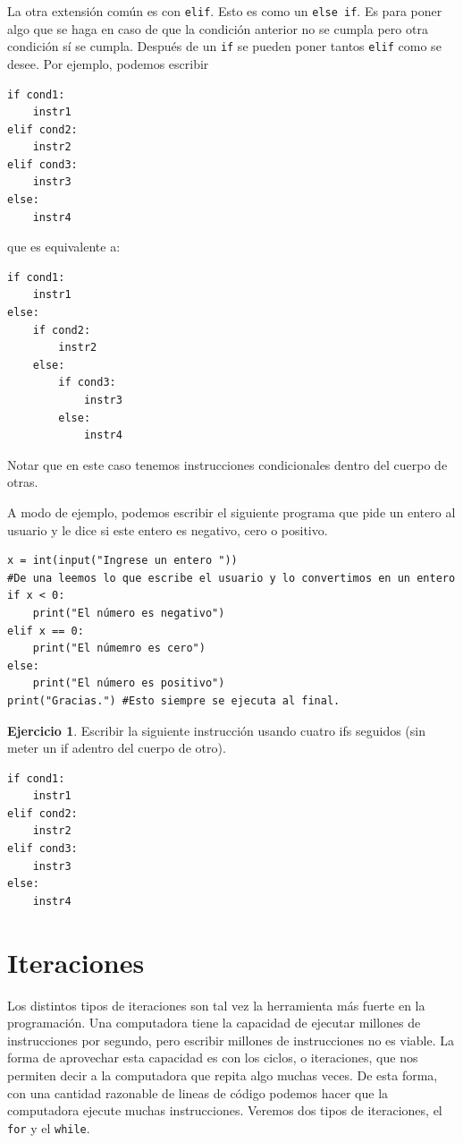 \documentclass[a4paper, 12pt]{report}
\theoremstyle{definition}
\newtheorem{ejercicio}{Ejercicio}[section]
\begin{document}
La otra extensión común es con {\tt elif}. Esto es como un {\tt else if}. Es para poner algo que se haga en caso de que la condición anterior no se cumpla pero otra condición sí se cumpla. Después de un {\tt if} se pueden poner tantos {\tt elif} como se desee. Por ejemplo, podemos escribir
\begin{verbatim}
if cond1:
    instr1
elif cond2:
    instr2
elif cond3:
    instr3
else:
    instr4
\end{verbatim}
que es equivalente a:
\begin{verbatim}
if cond1:
    instr1
else:
    if cond2:
        instr2
    else:
        if cond3:
            instr3
        else:
            instr4
\end{verbatim}
Notar que en este caso tenemos instrucciones condicionales dentro del cuerpo de otras.

A modo de ejemplo, podemos escribir el siguiente programa que pide un entero al usuario y le dice si este entero es negativo, cero o positivo.
\begin{verbatim}
x = int(input("Ingrese un entero "))
#De una leemos lo que escribe el usuario y lo convertimos en un entero
if x < 0:
    print("El número es negativo")
elif x == 0:
    print("El númemro es cero")
else:
    print("El número es positivo")
print("Gracias.") #Esto siempre se ejecuta al final.
\end{verbatim}

\begin{ejercicio}
	Escribir la siguiente instrucción usando cuatro ifs seguidos (sin meter un if adentro del cuerpo de otro).
\begin{verbatim}
if cond1:
    instr1
elif cond2:
    instr2
elif cond3:
    instr3
else:
    instr4
\end{verbatim}

\end{ejercicio}

\section{Iteraciones}

Los distintos tipos de iteraciones son tal vez la herramienta más fuerte en la programación. Una computadora tiene la capacidad de ejecutar millones de instrucciones por segundo, pero escribir millones de instrucciones no es viable. La forma de aprovechar esta capacidad es con los ciclos, o iteraciones, que nos permiten decir a la computadora que repita algo muchas veces. De esta forma, con una cantidad razonable de lineas de código podemos hacer que la computadora ejecute muchas instrucciones. Veremos dos tipos de iteraciones, el {\tt for} y el {\tt while}.
\end{document}
